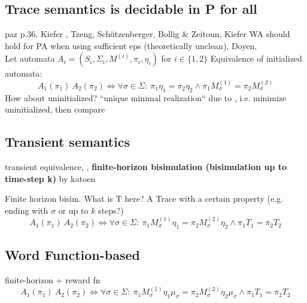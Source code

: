         \subsection{Trace semantics is decidable in P for all}
                \begin{definition}
                 
                \end{definition}

                paz p.36, Kiefer  , Tzeng, Schützenberger, Bollig \& Zeitoun, Kiefer WA should hold for PA when using sufficient eps (theoretically unclean), Doyen, \\
                Let automata $A_i = \left( S_i, \Sigma_i, M^{(i)}, \pi_i, \eta_i \right)$ for $i \in \{1, 2\}$
                Equivalence of initialized automata:
                \[ A_1(\pi_1) ~ A_2(\pi_2) \Leftrightarrow \forall \sigma \in \Sigma: \ \pi_1 \eta_1 = \pi_2 \eta_2 \wedge \pi_1 M^{(1)}_{\sigma} = \pi_2 M^{(2)}_{\sigma}  \]
                How about uninitialized? ``unique minimal realization`` due to \autocite{CT1}, i.e. minimize uninitialized, then compare \\
                
        \subsection{Transient semantics}
        \begin{definition}
         transient equivalence, , \textbf{finite-horizon bisimulation (bisimulation up to time-step k)} by katoen
        \end{definition}

            Finite horizon bisim.
            What is T here? A Trace with a certain property (e.g. ending with $\sigma$ or up to $k$ steps?)
            \[ A_1(\pi_1) ~ A_2(\pi_2) \Leftrightarrow \forall \sigma \in \Sigma: \ \pi_1 M^{(1)}_{\sigma} \eta_1 = \pi_2 M^{(2)}_{\sigma} \eta_2 \wedge \pi_1 T_1 = \pi_2  T_2 \]
            
        \subsection{Word Function-based}
            finite-horizon + reward fn
            \[ A_1(\pi_1) ~ A_2(\pi_2) \Leftrightarrow \forall \sigma \in \Sigma: \ \pi_1 M^{(1)}_{\sigma} \eta_1 \mu_{\sigma} = \pi_2 M^{(2)}_{\sigma} \eta_2 \mu_{\sigma} \wedge \pi_1 T_1 = \pi_2  T_2 \]    
        

